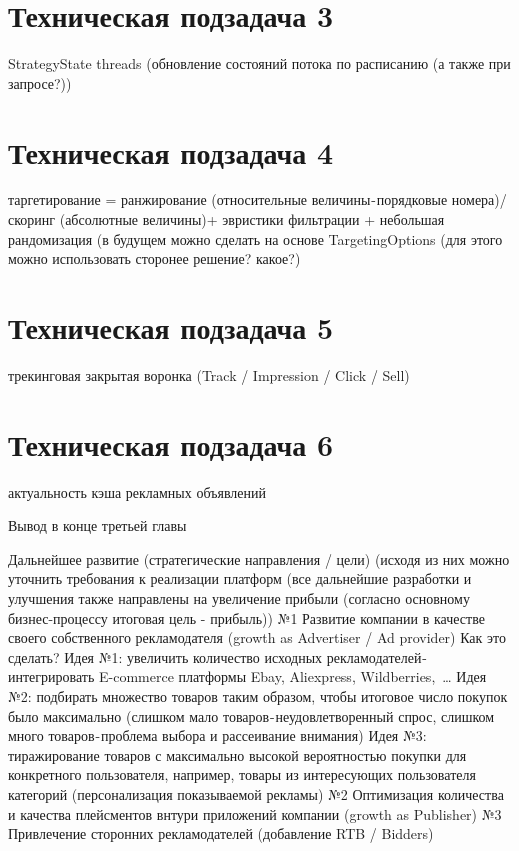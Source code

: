 \documentclass[times]{itmo-student-thesis}
\begin{document}
\section{Техническая подзадача 3}
StrategyState threads (обновление состояний потока по расписанию (а также при запросе?))

\section{Техническая подзадача 4}
таргетирование = ранжирование (относительные величины - порядковые номера)/ скоринг (абсолютные величины)+ эвристики фильтрации + небольшая рандомизация (в будущем можно сделать на основе TargetingOptions (для этого можно использовать сторонее решение? какое?)

\section{Техническая подзадача 5}
трекинговая закрытая воронка (Track / Impression / Click / Sell)

\section{Техническая подзадача 6} актуальность кэша рекламных объявлений


\chapterconclusion

Вывод в конце третьей главы

\startconclusionpage

Дальнейшее развитие (стратегические направления / цели) (исходя из них можно уточнить требования к реализации платформ
(все дальнейшие разработки и улучшения также направлены на увеличение прибыли (согласно основному бизнес-процессу итоговая цель - прибыль))
№1 Развитие компании в качестве своего собственного рекламодателя (growth as Advertiser / Ad provider)
Как это сделать?
Идея №1: увеличить количество исходных рекламодателей - интегрировать E-commerce платформы Ebay, Aliexpress, Wildberries, …
Идея №2: подбирать множество товаров таким образом, чтобы итоговое число покупок было максимально (слишком мало товаров - неудовлетворенный спрос, слишком много товаров - проблема выбора и рассеивание внимания)
Идея №3: тиражирование товаров с максимально высокой вероятностью покупки для конкретного пользователя, например, товары из интересующих пользователя категорий (персонализация показываемой рекламы)
№2 Оптимизация количества и качества плейсментов внтури приложений компании (growth as Publisher)
№3 Привлечение сторонних рекламодателей (добавление RTB / Bidders)

\printmainbibliography


\appendix

                
\end{document}
